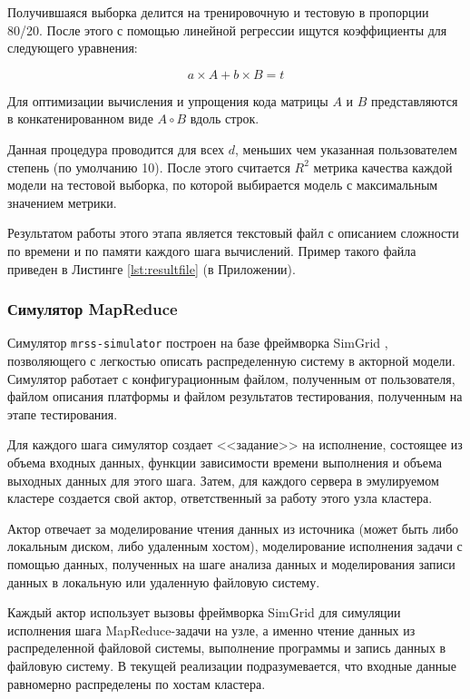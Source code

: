 \documentclass[../diploma.tex]{subfile}
\begin{document}
    Получившаяся выборка делится на тренировочную и тестовую в пропорции 80/20.
    После этого с помощью линейной регрессии ищутся коэффициенты для следующего
    уравнения:
    
    \begin{equation}
        a\times A + b \times B = t
    \end{equation}

    Для оптимизации вычисления и упрощения кода матрицы $A$ и $B$ представляются
    в конкатенированном виде $A\circ B$ вдоль строк. 

    Данная процедура проводится для всех $d$, меньших чем указанная
    пользователем степень (по умолчанию 10). После этого считается $R^2$ метрика
    качества каждой модели на тестовой выборка, по которой выбирается модель с
    максимальным значением метрики. 

    Результатом работы этого этапа является текстовый файл с описанием сложности
    по времени и по памяти каждого шага вычислений. Пример такого файла приведен
    в Листинге \ref{lst:resultfile} (в Приложении).

    \subsubsection{Симулятор MapReduce}
    
    Симулятор {\tt mrss-simulator} построен на базе фреймворка SimGrid
    \cite{simgrid}\cite{simgrid_paper}, позволяющего с легкостью описать
    распределенную систему в акторной модели. Симулятор работает с
    конфигурационным файлом, полученным от пользователя, файлом описания
    платформы и файлом результатов тестирования, полученным на этапе
    тестирования. 

    Для каждого шага симулятор создает <<задание>> на исполнение, состоящее из
    объема входных данных, функции зависимости времени выполнения и объема
    выходных данных для этого шага. Затем, для каждого сервера в эмулируемом
    кластере создается свой актор, ответственный за работу этого узла кластера.

    Актор отвечает за моделирование чтения данных из источника (может быть либо
    локальным диском, либо удаленным хостом), моделирование исполнения задачи с
    помощью данных, полученных на шаге анализа данных и моделирования записи
    данных в локальную или удаленную файловую систему. 
    
    Каждый актор использует вызовы фреймворка SimGrid для симуляции исполнения
    шага MapReduce-задачи на узле, а именно чтение данных из распределенной
    файловой системы, выполнение программы и запись данных в файловую систему. В
    текущей реализации подразумевается, что входные данные равномерно
    распределены по хостам кластера.
    
\end{document}
